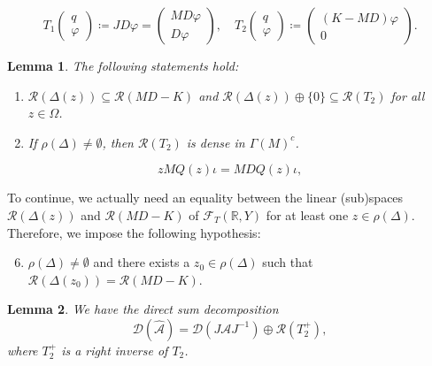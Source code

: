 \documentclass[10pt,a4paper]{amsart}
\newtheorem{lemma}{Lemma}
\begin{document}
\begin{equation} \label{eq:T12action}
 T_1 
    \begin{pmatrix}
        q \\
        \varphi
    \end{pmatrix}
    \coloneqq JD\varphi = \begin{pmatrix}
        MD \varphi \\
        D \varphi
    \end{pmatrix},    
    \quad 
    T_2 
        \begin{pmatrix}
        q \\
        \varphi
    \end{pmatrix}
    \coloneqq
        \begin{pmatrix}
        (K - MD)\varphi \\
        0
    \end{pmatrix}.
\end{equation}

\begin{lemma} \label{lemma:T2onto}
The following statements hold:
\begin{enumerate}
    \item $\mathcal{R}(\Delta(z)) \subseteq \mathcal{R}(MD - K)$ and $\mathcal{R}(\Delta(z)) \oplus \{0\} \subseteq \mathcal{R}(T_2)$ for all $z \in \Omega$.
    \item If $\rho(\Delta) \neq \emptyset$, then $\mathcal{R}(T_2)$ is dense in $\Gamma(M)^c$.
\end{enumerate}
\end{lemma}

\begin{equation} \label{eq:zM_on_Q}
    z M Q(z) \iota = MD Q(z) \iota,
\end{equation}

To continue, we actually need an equality between the linear (sub)spaces $\mathcal{R}(\Delta(z))$ and $ \mathcal{R}(MD - K)$ of $\mathcal{F}_T(\mathbb{R},Y)$ for at least one $z \in \rho(\Delta)$. Therefore, we impose the following hypothesis:
\begin{enumerate}[label=({H}{{\arabic*}})]
\setcounter{enumi}{5}
\item \label{hyp:rangeequal} 
$\rho(\Delta) \neq \emptyset$ and there exists a $z_0 \in \rho(\Delta)$ such that $\mathcal{R}(\Delta(z_0)) = \mathcal{R}(MD - K)$.
\end{enumerate}

\begin{lemma} \label{lemma:DAhatcompo}
We have the direct sum decomposition
\begin{equation} \label{eq:D(Ahat)directsum}
    \mathcal{D}(\hat{\mathcal{A}}) = \mathcal{D}(J\mathcal{A}J^{-1}) \oplus \mathcal{R}(T_2^+),
\end{equation}
where $T_2^+$ is a right inverse of $T_2$.
\end{lemma}
\end{document}
